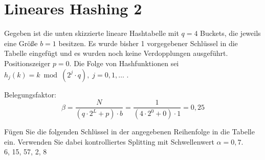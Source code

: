 \section{Lineares Hashing 2}

Gegeben ist die unten skizzierte lineare Hashtabelle mit $q = 4$ Buckets, die jeweils eine Größe $b = 1$ besitzen. Es wurde bisher 1 vorgegebener Schlüssel in die Tabelle eingefügt und es wurden noch keine Verdopplungen ausgeführt. Positionszeiger $p = 0$. Die Folge von Hashfunktionen sei $h_{j}(k) = k \bmod(2^{j} \cdot q), \; j = 0,1, \ldots$ .

\begin{minipage}{5cm}
\end{minipage}\hfill
\begin{minipage}{0.65\textwidth}
Belegungsfaktor:
\[\beta = \frac{N}{ (q \cdot 2^{L} + p) \cdot b} = \frac{1}{(4 \cdot 2^{0} + 0) \cdot 1} = 0,25\]
\end{minipage}

Fügen Sie die folgenden Schlüssel in der angegebenen Reihenfolge in die Tabelle ein. Verwenden Sie dabei kontrolliertes Splitting mit Schwellenwert $\alpha = 0,7$. \\
6, 15, 57, 2, 8

